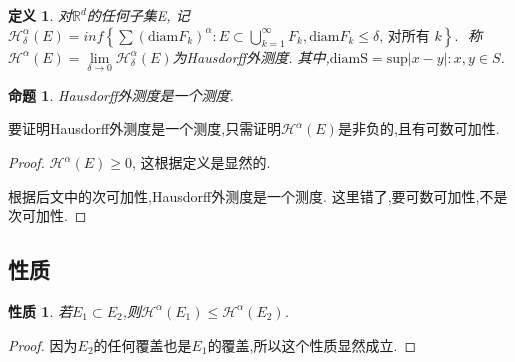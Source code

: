 \documentclass[hyperref,a4paper,UTF8]{ctexart}
\newtheorem{definition}{定义}[section]
\newtheorem{proposition}{{命题}}
\newtheorem{property}{{性质}}
\begin{document}
\begin{definition}
  对$\mathbb{R}^d$的任何子集E,
  记 $\mathcal{H}^{\alpha}_{\delta}(E) = inf \left\{\sum\left(\mathrm{\mathrm{diam}} F_k\right)^\alpha: E \subset \bigcup\limits_{k=1}^{\infty} F_k, \mathrm{diam} F_k \leqslant \delta \text {, 对所有 } k\right\} \text {. }$
  称$\mathcal{H}^{\alpha}(E)=\lim\limits_{\delta  \to 0}\mathcal{H}^{\alpha}_{\delta}(E)$为Hausdorff外测度.
  其中,$\mathrm{diamS} = \mathrm{sup}{|x-y|:x,y \in S}$. 
\end{definition}

\begin{proposition}
  Hausdorff外测度是一个测度.
\end{proposition}

要证明Hausdorff外测度是一个测度,只需证明$\mathcal{H}^{\alpha}(E)$是非负的,且有可数可加性. 
\begin{proof}
   $\mathcal{H}^{\alpha}(E) \geqslant 0$, 这根据定义是显然的.

  根据后文中的次可加性,Hausdorff外测度是一个测度. 这里错了,要可数可加性,不是次可加性.
\end{proof}


\subsection{性质}
  \begin{property}
    若$E_1 \subset E_2 $,则$\mathcal{H}^{\alpha}(E_1) \leq \mathcal{H}^{\alpha}(E_2)$.
  \end{property}
  \begin{proof}
    因为$E_2$的任何覆盖也是$E_1$的覆盖,所以这个性质显然成立.
  \end{proof}
\end{document}
